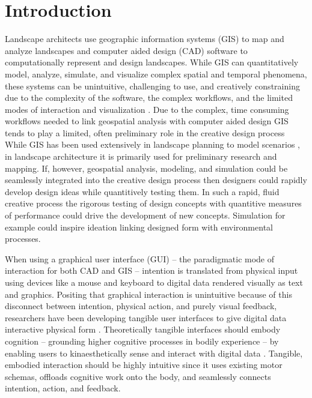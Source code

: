 \documentclass[Afour,sagev,times]{sagej} %
\begin{document}

\section{Introduction}

Landscape architects use 
geographic information systems (GIS) to map and analyze landscapes
and computer aided design (CAD) software
to computationally represent and design landscapes.
While GIS can quantitatively model, analyze, simulate, and visualize 
complex spatial and temporal phenomena,
these systems can be unintuitive, 
challenging to use, and creatively constraining
due to the complexity of the software, 
the complex workflows, 
and the limited modes of interaction and visualization 
\cite{Ratti2004}. 
Due to the complex, time consuming workflows 
needed to link geospatial analysis with computer aided design 
GIS tends to play a limited, 
often preliminary role in the creative design process
While GIS has been used extensively in landscape planning 
to model scenarios \cite{Steinitz2004,Baker2004,Steinitz2012},
in landscape architecture
it is primarily used for preliminary research and mapping.
If, however, geospatial analysis, modeling, and simulation
could be seamlessly integrated into the creative design process 
then designers could rapidly develop design ideas
while quantitively testing them. 
In such a rapid, fluid creative process
the rigorous testing of design concepts 
with quantitive measures of performance 
could drive the development of new concepts.
Simulation for example could inspire ideation 
linking designed form with environmental processes. 

When using a graphical user interface (GUI) 
-- the paradigmatic mode of interaction for both CAD and GIS --  
intention is translated from physical input 
using devices like a mouse and keyboard 
to digital data rendered visually as text and graphics. 
Positing that graphical interaction is unintuitive
because of this disconnect between 
intention, physical action, and purely visual feedback,
researchers have been developing tangible user interfaces 
to give digital data interactive physical form 
\cite{Dourish2001,Ishii2008}. 
Theoretically tangible interfaces should embody cognition 
-- grounding higher cognitive processes in bodily experience --
by enabling users to kinaesthetically sense and interact with digital data
\cite{Kirsh2013}.
Tangible, embodied interaction should be highly intuitive 
since it uses existing motor schemas,  
offloads cognitive work onto the body,
and seamlessly connects intention, action, and feedback.
\end{document}
